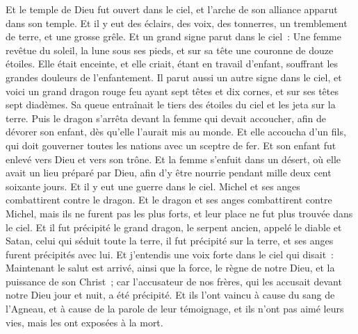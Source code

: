 \begin{multicols}{2}
Et le temple de Dieu fut ouvert dans le ciel, et l'arche de son alliance apparut dans son temple. Et il y eut des éclairs, des voix, des tonnerres, un tremblement de terre, et une grosse grêle.
\VerseOne{}Et un grand signe parut dans le ciel~: Une femme revêtue du soleil, la lune sous ses pieds, et sur sa tête une couronne de douze étoiles.
Elle était enceinte, et elle criait, étant en travail d'enfant, souffrant les grandes douleurs de l'enfantement.
Il parut aussi un autre signe dans le ciel, et voici un grand dragon rouge feu ayant sept têtes et dix cornes, et sur ses têtes sept diadèmes.
Sa queue entraînait le tiers des étoiles du ciel et les jeta sur la terre. Puis le dragon s'arrêta devant la femme qui devait accoucher, afin de dévorer son enfant, dès qu'elle l'aurait mis au monde.
Et elle accoucha d'un fils, qui doit gouverner toutes les nations avec un sceptre de fer. Et son enfant fut enlevé vers Dieu et vers son trône.
Et la femme s'enfuit dans un désert, où elle avait un lieu préparé par Dieu, afin d'y être nourrie pendant mille deux cent soixante jours.
Et il y eut une guerre dans le ciel. Michel et ses anges combattirent contre le dragon. Et le dragon et ses anges combattirent contre Michel,
mais ils ne furent pas les plus forts, et leur place ne fut plus trouvée dans le ciel.
Et il fut précipité le grand dragon, le serpent ancien, appelé le diable et Satan, celui qui séduit toute la terre, il fut précipité sur la terre, et ses anges furent précipités avec lui.
Et j'entendis une voix forte dans le ciel qui disait~: Maintenant le salut est arrivé, ainsi que la force, le règne de notre Dieu, et la puissance de son Christ~; car l'accusateur de nos frères, qui les accusait devant notre Dieu jour et nuit, a été précipité.
Et ils l'ont vaincu à cause du sang de l'Agneau, et à cause de la parole de leur témoignage, et ils n'ont pas aimé leurs vies, mais les ont exposées à la mort.

\end{multicols}
